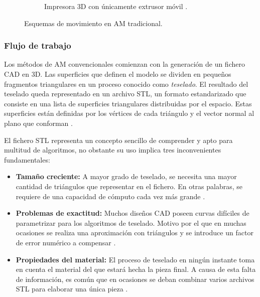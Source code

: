 \begin{figure}[h!]
\begin{subfigure}[h]{0.45\linewidth}
        \caption{Impresora 3D con únicamente extrusor móvil \cite{impresoraDagoma}.}
        \label{fig:impresora3d_2}
    \end{subfigure}
    \caption{Esquemas de movimiento en \acrshort{AM} tradicional.}
\end{figure}

\subsubsection*{Flujo de trabajo}
\hypertarget{Flujo de trabajo}{}
 \label{sec:flujo_trabajo}

 Los métodos de \acrshort{AM} convencionales comienzan con la generación de un fichero \acrshort{CAD} en 3D. Las superficies que definen el modelo se dividen en pequeños fragmentos triangulares en un proceso conocido como \textit{teselado}. El resultado del teselado queda representado en un archivo \acrshort{STL}, un formato estandarizado que consiste en una lista de superficies triangulares distribuidas por el espacio. Estas superficies están definidas por los vértices de cada triángulo y el vector normal al plano que conforman \cite{Brown2014}\cite{Thompson2016}. 

El fichero \acrshort{STL} representa un concepto sencillo de comprender y apto para multitud de algoritmos, no obstante su uso implica tres inconvenientes fundamentales:
\begin{itemize}
    \item \textbf{Tamaño creciente:} A mayor grado de teselado, se necesita una mayor cantidad de triángulos que representar en el fichero. En otras palabras, se requiere de una capacidad de cómputo cada vez más grande \cite{Gibson2017}.
    \item \textbf{Problemas de exactitud:} Muchos diseños \acrshort{CAD} poseen curvas difíciles de parametrizar para los algoritmos de teselado. Motivo por el que en muchas ocasiones se realiza una aproximación con triángulos y se introduce un factor de error numérico a compensar \cite{Gohari2016}.
    \item \textbf{Propiedades del material:} El proceso de teselado en ningún instante toma en cuenta el material del que estará hecha la pieza final. A causa de esta falta de información, es común que en ocasiones se deban combinar varios archivos \acrshort{STL} para elaborar una única pieza \cite{Yang2017}.
\end{itemize}

